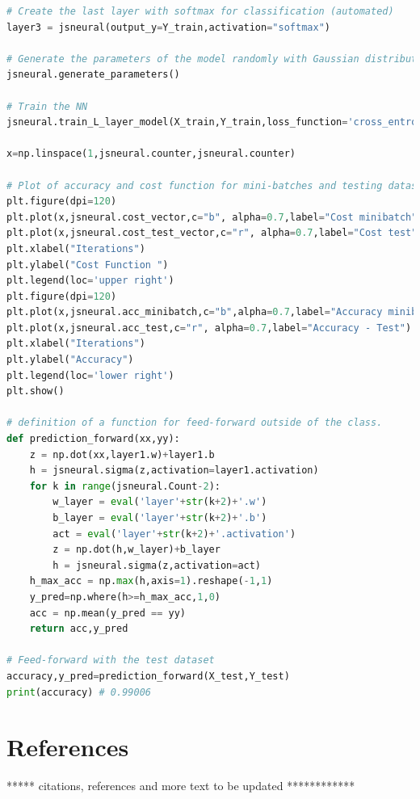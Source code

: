 \documentclass{article}
\begin{document}
\begin{lstlisting}[language=Python]
# Create the last layer with softmax for classification (automated)
layer3 = jsneural(output_y=Y_train,activation="softmax") 

# Generate the parameters of the model randomly with Gaussian distributions and stardard deviation of 0.01, bias = 0.
jsneural.generate_parameters()

# Train the NN
jsneural.train_L_layer_model(X_train,Y_train,loss_function='cross_entropy') 

x=np.linspace(1,jsneural.counter,jsneural.counter)

# Plot of accuracy and cost function for mini-batches and testing dataset.
plt.figure(dpi=120)
plt.plot(x,jsneural.cost_vector,c="b", alpha=0.7,label="Cost minibatch")
plt.plot(x,jsneural.cost_test_vector,c="r", alpha=0.7,label="Cost test")
plt.xlabel("Iterations")
plt.ylabel("Cost Function ")
plt.legend(loc='upper right')
plt.figure(dpi=120)
plt.plot(x,jsneural.acc_minibatch,c="b",alpha=0.7,label="Accuracy minibatch Train")
plt.plot(x,jsneural.acc_test,c="r", alpha=0.7,label="Accuracy - Test")
plt.xlabel("Iterations")
plt.ylabel("Accuracy")
plt.legend(loc='lower right')
plt.show()

# definition of a function for feed-forward outside of the class.
def prediction_forward(xx,yy):
    z = np.dot(xx,layer1.w)+layer1.b
    h = jsneural.sigma(z,activation=layer1.activation)
    for k in range(jsneural.Count-2):
        w_layer = eval('layer'+str(k+2)+'.w')
        b_layer = eval('layer'+str(k+2)+'.b')
        act = eval('layer'+str(k+2)+'.activation')
        z = np.dot(h,w_layer)+b_layer
        h = jsneural.sigma(z,activation=act)
    h_max_acc = np.max(h,axis=1).reshape(-1,1)
    y_pred=np.where(h>=h_max_acc,1,0)
    acc = np.mean(y_pred == yy)
    return acc,y_pred
    
# Feed-forward with the test dataset
accuracy,y_pred=prediction_forward(X_test,Y_test) 
print(accuracy) # 0.99006
\end{lstlisting} 

\section{References}
***** citations, references and more text to be updated ************
\end{document}
